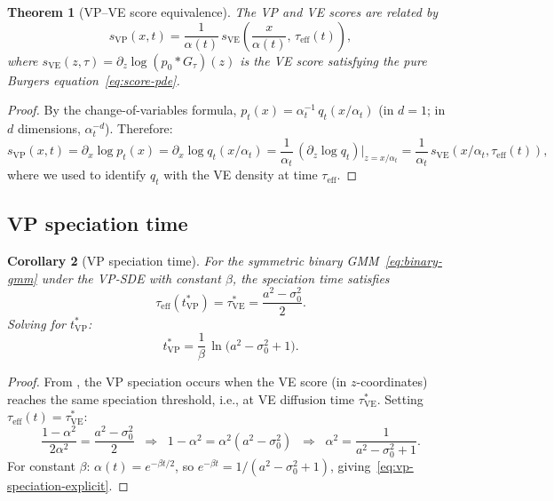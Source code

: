 \documentclass[11pt]{article}
\newtheorem{theorem}{Theorem}[section]
\newtheorem{corollary}[theorem]{Corollary}
\begin{document}
\begin{theorem}[VP--VE score equivalence]\label{thm:vp-ve}
The VP and VE scores are related by
\begin{equation}\label{eq:vp-ve-score}
  s_{\mathrm{VP}}(x,t) = \frac{1}{\alpha(t)}\,s_{\mathrm{VE}}\!\left(\frac{x}{\alpha(t)},\, \tau_{\mathrm{eff}}(t)\right),
\end{equation}
where $s_{\mathrm{VE}}(z,\tau) = \partial_z \log(p_0 * G_\tau)(z)$ is the VE score satisfying the pure Burgers equation~\eqref{eq:score-pde}.
\end{theorem}

\begin{proof}
By the change-of-variables formula, $p_t(x) = \alpha_t^{-1}\,q_t(x/\alpha_t)$ (in $d = 1$; in $d$ dimensions, $\alpha_t^{-d}$).
Therefore:
\[
  s_{\mathrm{VP}}(x,t)
  = \partial_x \log p_t(x)
  = \partial_x \log q_t(x/\alpha_t)
  = \frac{1}{\alpha_t}\,(\partial_z \log q_t)\big|_{z=x/\alpha_t}
  = \frac{1}{\alpha_t}\,s_{\mathrm{VE}}(x/\alpha_t, \tau_{\mathrm{eff}}(t)),
\]
where we used  to identify $q_t$ with the VE density at time $\tau_{\mathrm{eff}}$.
\end{proof}

\subsection{VP speciation time}\label{sec:vp:speciation}

\begin{corollary}[VP speciation time]\label{cor:vp-speciation}
For the symmetric binary GMM~\eqref{eq:binary-gmm} under the VP-SDE with constant $\beta$, the speciation time satisfies
\begin{equation}\label{eq:vp-speciation}
  \tau_{\mathrm{eff}}(t^\ast_{\mathrm{VP}}) = \tau^\ast_{\mathrm{VE}} = \frac{a^2 - \sigma_0^2}{2}.
\end{equation}
Solving for $t^\ast_{\mathrm{VP}}$:
\begin{equation}\label{eq:vp-speciation-explicit}
  t^\ast_{\mathrm{VP}}
  = \frac{1}{\beta}\,\ln\!\bigl(a^2 - \sigma_0^2 + 1\bigr).
\end{equation}
\end{corollary}

\begin{proof}
From , the VP speciation occurs when the VE score (in $z$-coordinates) reaches the same speciation threshold, i.e., at VE diffusion time $\tau^\ast_{\mathrm{VE}}$.
Setting $\tau_{\mathrm{eff}}(t) = \tau^\ast_{\mathrm{VE}}$:
\[
  \frac{1 - \alpha^2}{2\alpha^2} = \frac{a^2 - \sigma_0^2}{2}
  \;\;\Longrightarrow\;\;
  1 - \alpha^2 = \alpha^2(a^2 - \sigma_0^2)
  \;\;\Longrightarrow\;\;
  \alpha^2 = \frac{1}{a^2 - \sigma_0^2 + 1}.
\]
For constant $\beta$: $\alpha(t) = e^{-\beta t/2}$, so $e^{-\beta t} = 1/(a^2 - \sigma_0^2 + 1)$, giving~\eqref{eq:vp-speciation-explicit}.
\end{proof}
\end{document}
